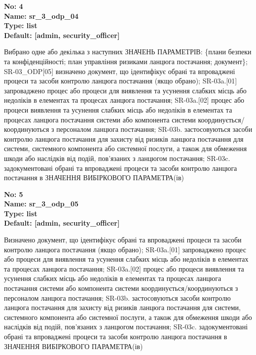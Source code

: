 \documentclass{article}
\begin{document}
{\footnotesize\bfseries
No: 4\\
Name: sr\_\allowbreak{}3\_\allowbreak{}odp\_\allowbreak{}04\\
Type: list\\
Default: [\textquotedbl{}admin\textquotedbl{}, \textquotedbl{}security\_\allowbreak{}officer\textquotedbl{}]
}

{\footnotesize Вибрано одне або декілька з наступних ЗНАЧЕНЬ ПАРАМЕТРІВ: \{плани безпеки та конфіденційності; план управління ризиками ланцюга постачання; документ\}; SR-03\_\allowbreak{}ODP[05] визначено документ, що ідентифікує обрані та впроваджені процеси та засоби контролю ланцюга постачання (якщо обрано); SR-03a.[01] запроваджено процес або процеси для виявлення та усунення слабких місць або недоліків в елементах та процесах ланцюга постачання; SR-03a.[02] процес або процеси виявлення та усунення слабких місць або недоліків в елементах та процесах ланцюга постачання системи або компонента системи координується/координуються з персоналом ланцюга постачання; SR-03b. застосовуються засоби контролю ланцюга постачання для захисту від ризиків ланцюга постачання для системи, системного компонента або системної послуги, а також для обмеження шкоди або наслідків від подій, пов'язаних з ланцюгом постачання; SR-03c. задокументовані обрані та впроваджені процеси та засоби контролю ланцюга постачання в ЗНАЧЕННЯ ВИБІРКОВОГО ПАРАМЕТРА(ів)}


{\footnotesize\bfseries
No: 5\\
Name: sr\_\allowbreak{}3\_\allowbreak{}odp\_\allowbreak{}05\\
Type: list\\
Default: [\textquotedbl{}admin\textquotedbl{}, \textquotedbl{}security\_\allowbreak{}officer\textquotedbl{}]
}

{\footnotesize Визначено документ, що ідентифікує обрані та впроваджені процеси та засоби контролю ланцюга постачання (якщо обрано); SR-03a.[01] запроваджено процес або процеси для виявлення та усунення слабких місць або недоліків в елементах та процесах ланцюга постачання; SR-03a.[02] процес або процеси виявлення та усунення слабких місць або недоліків в елементах та процесах ланцюга постачання системи або компонента системи координується/координуються з персоналом ланцюга постачання; SR-03b. застосовуються засоби контролю ланцюга постачання для захисту від ризиків ланцюга постачання для системи, системного компонента або системної послуги, а також для обмеження шкоди або наслідків від подій, пов'язаних з ланцюгом постачання; SR-03c. задокументовані обрані та впроваджені процеси та засоби контролю ланцюга постачання в ЗНАЧЕННЯ ВИБІРКОВОГО ПАРАМЕТРА(ів)}
\end{document}
